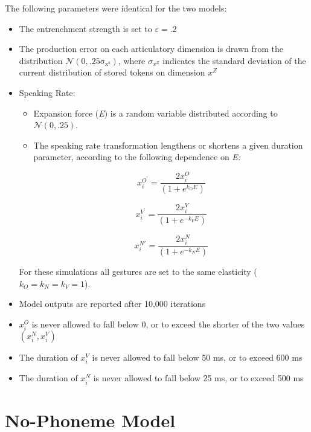 The following parameters were identical for the two models:
\begin{itemize}
\item The entrenchment strength is set to $\varepsilon=.2$
\item The production error on each articulatory dimension is drawn from
the distribution $\mathcal{\mathscr{N}\left(\mathrm{0,.25\sigma_{x^{z}}}\right)}$,
where $\sigma_{x^{Z}}$ indicates the standard deviation of the current
distribution of stored tokens on dimension $x^{Z}$
\item Speaking Rate:
\begin{itemize}
\item Expansion force (\emph{E}) is a random variable distributed according
to $\mathcal{\mathscr{N}\left(\mathrm{0,.25}\right)}$. 
\item The speaking rate transformation lengthens or shortens a given duration
parameter, according to the following dependence on \emph{E:}

\begin{equation}
x_{i}^{O^{\prime}}=\frac{2x_{i}^{O}}{(1+e^{k_{O}E})}\label{eq:Speaking rate transform-1}
\end{equation}

\begin{equation}
x_{i}^{V^{\prime}}=\frac{2x_{i}^{V}}{(1+e^{-k_{V}E})}\label{eq:Speaking rate transform-1-1}
\end{equation}

\begin{equation}
x_{i}^{N\prime}=\frac{2x_{i}^{N}}{(1+e^{-k_{N}E})}\label{eq:Speaking rate transform-1-1-1}
\end{equation}

\end{itemize}
For these simulations all gestures are set to the same elasticity
($k_{O}=k_{N}=k_{V}=1$). 
\item Model outputs are reported after 10,000 iterations
\item $x_{i}^{O}$ is never allowed to fall below 0, or to exceed the shorter
of the two values $(x_{i}^{N},x_{i}^{V})$
\item The duration of $x_{i}^{V}$ is never allowed to fall below 50 ms,
or to exceed 600 ms
\item The duration of $x_{i}^{N}$ is never allowed to fall below 25 ms,
or to exceed 500 ms
\end{itemize}

\section{No-Phoneme Model}

